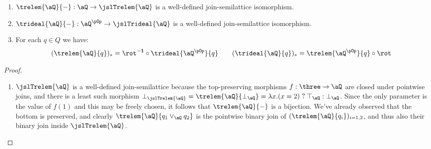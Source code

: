 \documentclass{article}
\begin{document}
\begin{lemma}
\label{lem:trelem_trideal_well_def}
\item
\begin{enumerate}
\item
$\trelem{\aQ}{-} : \aQ \to \jslTrelem{\aQ}$ is a well-defined join-semilattice isomorphism.
\item
$\trideal{\aQ}{-} : \aQ^{\pOp} \to \jslTrideal{\aQ}$ is a well-defined join-semilattice isomorphism.
\item
For each $q \in Q$ we have:
\[
(\trelem{\aQ}{q})_* = \rot^{\bf-1} \circ \trideal{\aQ^{\pOp}}{q}
\qquad
(\trideal{\aQ}{q})_* = \trelem{\aQ^{\pOp}}{q} \circ \rot
\]
\end{enumerate}
\end{lemma}

\begin{proof}
\item
\begin{enumerate}
\item
$\jslTrelem{\aQ}$ is a well-defined join-semilattice because the top-preserving morphisms $f : \three \to \aQ$ are closed under pointwise joins, and there is a least such morphism $\bot_{\jslTrelem{\aQ}} = \trelem{\aQ}{\bot_\aQ} = \lambda x.(x = 2)\;?\; \top_\aQ : \bot_\aQ$. Since the only parameter is the value of $f(1)$ and this may be freely chosen, it follows that $\trelem{\aQ}{-}$ is a bijection. We've already observed that the bottom is preserved, and clearly $\trelem{\aQ}{q_1 \lor_\aQ q_2}$ is the pointwise binary join of $(\trelem{\aQ}{q_i})_{i = 1,2}$, and thus also their binary join inside $\jslTrelem{\aQ}$.



\end{enumerate}
\end{proof}
\end{document}
